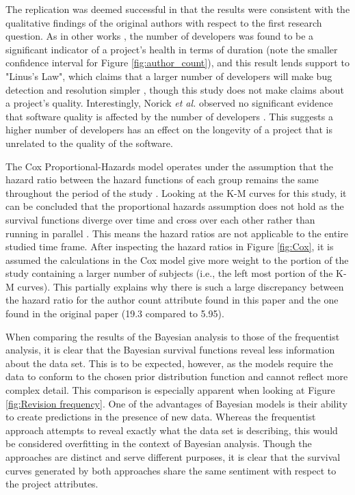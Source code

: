 \documentclass[sigconf,review]{acmart}
\begin{document}
The replication was deemed successful in that the results were consistent with the qualitative findings of the original authors with respect to the first research question.
As in other works \cite{samoladas2010survival}, the number of developers was found to be a significant indicator of a project's health in terms of duration (note the smaller confidence interval for Figure \ref{fig:author_count}), and this result lends support to "Linus's Law", which claims that a larger number of developers will make bug detection and resolution simpler \cite{raymond2001LinusLaw}, though this study does not make claims about a project's quality.
Interestingly, Norick \emph{et al.} observed no significant evidence that software quality is affected by the number of developers \cite{norick2010effects}.
This suggests a higher number of developers has an effect on the longevity of a project that is unrelated to the quality of the software.

The Cox Proportional-Hazards model operates under the assumption that the hazard ratio between the hazard functions of each group remains the same throughout the period of the study \cite{stel2011cox}.
Looking at the K-M curves for this study, it can be concluded that the proportional hazards assumption does not hold as the survival functions diverge over time and cross over each other rather than running in parallel \cite{persson2007ACO}.
This means the hazard ratios are not applicable to the entire studied time frame.
After inspecting the hazard ratios in Figure \ref{fig:Cox}, it is assumed the calculations in the Cox model give more weight to the portion of the study containing a larger number of subjects (i.e., the left most portion of the K-M curves).
This partially explains why there is such a large discrepancy between the hazard ratio for the author count attribute found in this paper and the one found in the original paper (19.3 compared to 5.95).

When comparing the results of the Bayesian analysis to those of the frequentist analysis, it is clear that the Bayesian survival functions reveal less information about the data set.
This is to be expected, however, as the models require the data to conform to the chosen prior distribution function and cannot reflect more complex detail.
This comparison is especially apparent when looking at Figure \ref{fig:Revision frequency}.
One of the advantages of Bayesian models is their ability to create predictions in the presence of new data.
Whereas the frequentist approach attempts to reveal exactly what the data set is describing, this would be considered overfitting in the context of Bayesian analysis.
Though the approaches are distinct and serve different purposes, it is clear that the survival curves generated by both approaches share the same sentiment with respect to the project attributes.
\end{document}
